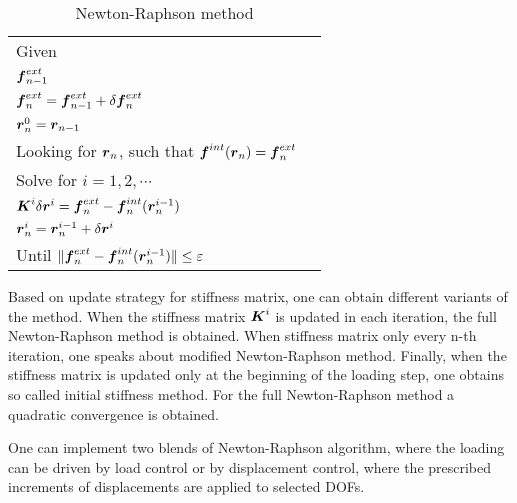 \begin{table}[h!]
  \begin{center}
  \begin{tabular}{|l|l|}
    \hline
    Given \\
    \;\;$\mbox{\boldmath$f$}^{ext}_{n-1}$\\
    \;\;$\mbox{\boldmath$f$}^{ext}_{n}=\mbox{\boldmath$f$}^{ext}_{n-1}+\delta\mbox{\boldmath$f$}^{ext}_n$\\
    \;\;$\mbox{\boldmath$r$}^{0}_{n} = \mbox{\boldmath$r$}_{n-1}$\\
    Looking for $\mbox{\boldmath$r$}_n$, such that $\mbox{\boldmath$f$}^{int}(\mbox{\boldmath$r$}_n) = \mbox{\boldmath$f$}^{ext}_n$\\
    Solve for $i=1,2,\cdots$\\ 
    \;\;$\mbox{\boldmath$K$}^{i}\delta\mbox{\boldmath$r$}^{i} = \mbox{\boldmath$f$}^{ext}_n-\mbox{\boldmath$f$}^{int}_n(\mbox{\boldmath$r$}^{i-1}_{n})$\\
    \;\;$\mbox{\boldmath$r$}^i_{n} = \mbox{\boldmath$r$}^{i-1}_{n}+\delta\mbox{\boldmath$r$}^i$\\
    Until $\|\mbox{\boldmath$f$}^{ext}_n-\mbox{\boldmath$f$}^{int}_n(\mbox{\boldmath$r$}^{i-1}_{n})\| \le \varepsilon$\\
    \hline
  \end{tabular}
  \end{center}
  \caption{Newton-Raphson method}
  \label{tab:newtonraphson}
\end{table}

Based on update strategy for stiffness matrix, one can obtain different variants of the method. 
When the stiffness matrix $\mbox{\boldmath$K$}^{i}$ is updated in each iteration, the full Newton-Raphson method is obtained. When stiffness matrix only every n-th iteration, one speaks about modified Newton-Raphson method. Finally, when the stiffness matrix is updated only at the beginning of the loading step, one obtains so called initial stiffness method.
For the full Newton-Raphson method a quadratic convergence is obtained.

One can implement two blends of Newton-Raphson algorithm, where the loading can be driven by load control or by displacement control, where the prescribed increments of displacements are applied to selected DOFs.

